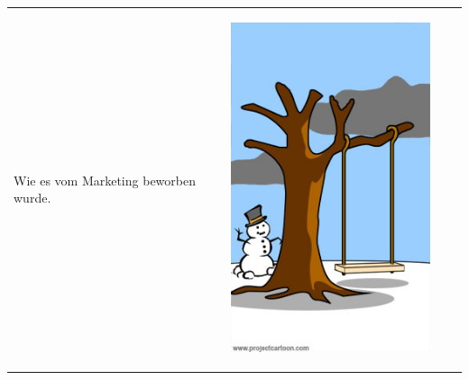 \begin{tabularx}{\textwidth}{XXXX}
\begin{minipage}[t]{0.23\textwidth}
\begin{center}
Wie es vom Marketing beworben wurde.
\end{center}
\end{minipage}
& 
\begin{minipage}[t]{0.23\textwidth}
\begin{center}
\includegraphics[width=1.0\textwidth]{./inf/SEKII/29_Softwaretechnik/PM_11.jpg}


\end{center}
\end{minipage}
\end{tabularx}
